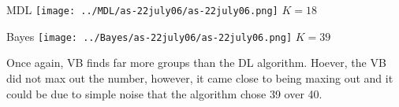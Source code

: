 \begin{minipage}{0.45\linewidth}
MDL
\centering
\texttt{[image: ../MDL/as-22july06/as-22july06.png]}
$K=18$

\end{minipage}
\begin{minipage}{0.45\linewidth}
Bayes
\centering
\texttt{[image: ../Bayes/as-22july06/as-22july06.png]}
$K=39$
\end{minipage}
\vspace{10pt}

Once again, VB finds far more groups than the DL algorithm. Hoever, the VB
did not max out the number, however, it came close to being maxing out and
it could be due to simple noise that the algorithm chose 39 over 40.
